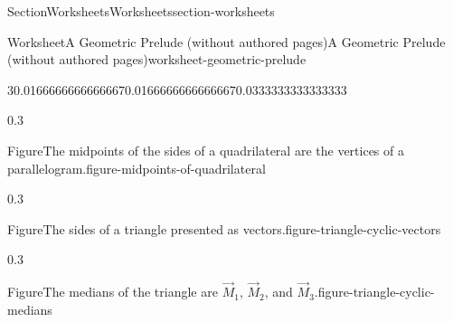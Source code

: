 \documentclass[twoside,10pt,]{article}
\numberwithin{equation}{section}
\begin{document}
\begin{sectionptx}{Section}{Worksheets}{}{Worksheets}{}{}{section-worksheets}
\begin{worksheet-subsection}{Worksheet}{A Geometric Prelude (without authored pages)}{}{A Geometric Prelude (without authored pages)}{}{}{worksheet-geometric-prelude}
\begin{introduction}{}
\begin{sidebyside}{3}{0.0166666666666667}{0.0166666666666667}{0.0333333333333333}
\begin{sbspanel}{0.3}%
\begin{panelfigureptx}{Figure}{The midpoints of the sides of a quadrilateral are the vertices of a parallelogram.}{figure-midpoints-of-quadrilateral}{}%
\noindent{}%
\tcblower
\end{panelfigureptx}%
\end{sbspanel}%
\begin{sbspanel}{0.3}%
\begin{panelfigureptx}{Figure}{The sides of a triangle presented as vectors.}{figure-triangle-cyclic-vectors}{}%
\noindent{}%
\tcblower
\end{panelfigureptx}%
\end{sbspanel}%
\begin{sbspanel}{0.3}%
\begin{panelfigureptx}{Figure}{The medians of the triangle are \(\vec{M}_1\), \(\vec{M}_2\), and \(\vec{M}_3\).}{figure-triangle-cyclic-medians}{}%
\noindent{}
\end{panelfigureptx}
\end{sbspanel}
\end{sidebyside}
\end{introduction}
\end{worksheet-subsection}
\end{sectionptx}
\end{document}
